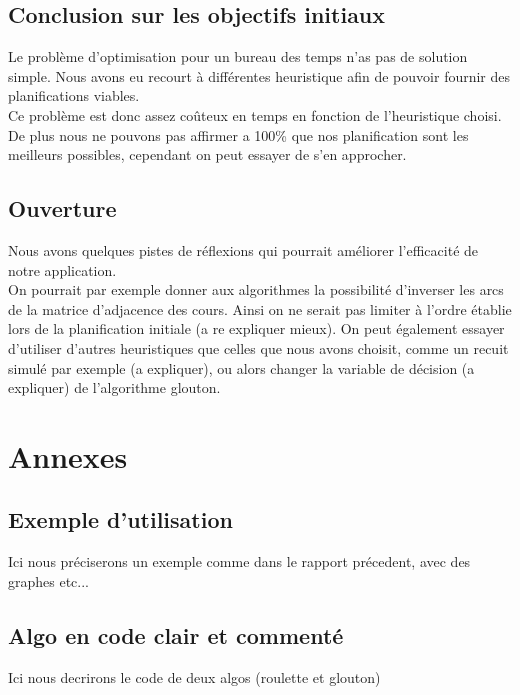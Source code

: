 \documentclass[a4paper,11pt]{article}
\begin{document}
	\subsection{Conclusion sur les objectifs initiaux}
	Le problème d'optimisation pour un bureau des temps n'as pas de solution simple. Nous avons eu recourt à différentes heuristique afin de pouvoir fournir des planifications viables.\\
	Ce problème est donc assez coûteux en temps en fonction de l'heuristique choisi. De plus nous ne pouvons pas affirmer a 100\% que nos planification sont les meilleurs possibles, cependant on peut essayer de s'en approcher.
	\subsection{Ouverture}
	Nous avons quelques pistes de réflexions qui pourrait améliorer l'efficacité de notre application.\\
	On pourrait par exemple donner aux algorithmes la possibilité d'inverser les arcs de la matrice d'adjacence des cours. Ainsi on ne serait pas limiter à l'ordre établie lors de la planification initiale (a re expliquer mieux).
	On peut également essayer d'utiliser d'autres heuristiques que celles que nous avons choisit, comme un recuit simulé par exemple (a expliquer), ou alors changer la variable de décision (a expliquer) de l'algorithme glouton.
\section{Annexes}
	\subsection{Exemple d'utilisation}
		Ici nous préciserons un exemple comme dans le rapport précedent, avec des graphes etc...
	\subsection{Algo en code clair et commenté}
		Ici nous decrirons le code de deux algos (roulette et glouton)
\end{document}
